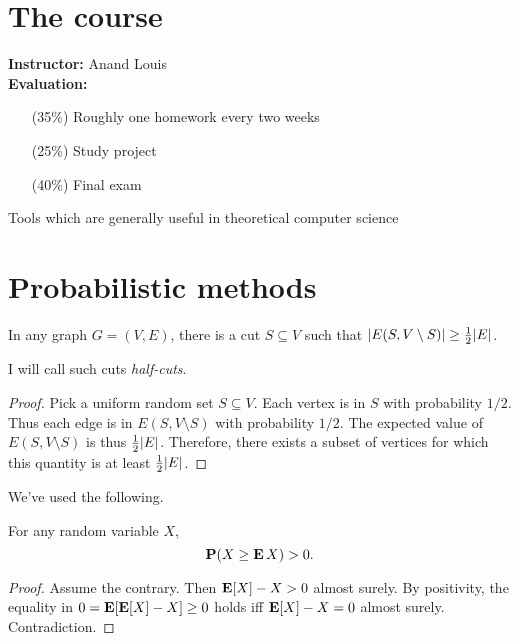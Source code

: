 \chapter*{The course}

\textbf{Instructor:} Anand Louis
\\[1em]
\textbf{Evaluation:}
\begin{itemize}
    \item[(35\%)] Roughly one homework every two weeks
    \item[(25\%)] Study project
    \item[(40\%)] Final exam
\end{itemize}

\begin{center}
    Tools which are generally useful in theoretical computer science
\end{center}

\chapter{Probabilistic methods} \label{chp:prob}
\begin{proposition} \label{thm:half-cut}
    In any graph $G = (V, E)$, there is a cut $S \subseteq V$ such that
    $\lvert E(S, V \setminus S)\rvert \ge \frac12 \lvert E\rvert$.
\end{proposition}
I will call such cuts \emph{half-cuts}.
\begin{proof}
    Pick a uniform random set $S \subseteq V$.
    Each vertex is in $S$ with probability $1 / 2$.
    Thus each edge is in $E(S, V \setminus S)$ with probability $1 / 2$.
    The expected value of $E(S, V \setminus S)$ is thus $\frac12 \lvert E\rvert$.
    Therefore, there exists a subset of vertices for which this
    quantity is at least $\frac12 \lvert E\rvert$.
\end{proof}
We've used the following.
\begin{lemma}
    For any random variable $X$, \[
        \operatorname{\mathbf P}(X \ge \operatorname{\mathbf E} X) > 0.
    \]
\end{lemma}
\begin{proof}
    Assume the contrary.
    Then $\operatorname{\mathbf E}[X] - X > 0$ almost surely.
    By positivity, the equality in $0 = \operatorname{\mathbf E}[\operatorname{\mathbf E}[X] - X] \ge 0$ holds iff
    $\operatorname{\mathbf E}[X] - X = 0$ almost surely.
    Contradiction.
\end{proof}

